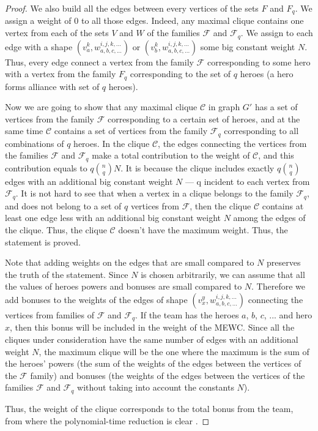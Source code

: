 \documentclass[smallextended]{svjour3}       %
\begin{document}
\begin{proof}
    We also build all the edges between every vertices of the sets $ F $ and $ F_q $. We assign a weight of 0 to all those edges. Indeed, any maximal clique contains one vertex from each of the sets $ V $ and $ W $ of the families $\mathcal {F}$ and $\mathcal {F}_q$. We assign to each edge with a shape $ (v_a^k, w_ {a, b, c, ...}^ {i, j, k, ...}) $ or $ (v_b^k, w_{a, b, c , ...}^{i, j, k, ...}) $ some big constant weight $ N $. Thus, every edge connect a vertex from the family $ \mathcal{F} $ corresponding to some hero with a vertex from the family $ F_q $ corresponding to the set of $ q $ heroes (a hero forms alliance with set of $q$ heroes). 
    
     Now we are going to show that any maximal clique $\mathcal{C}$ in graph $G'$ has a set of vertices from the family $\mathcal{F}$ corresponding to a certain set of heroes, and at the same time $\mathcal{C}$ contains a set of vertices from the family $ \mathcal{F}_q $ corresponding to all combinations of $q$ heroes. In the clique $\mathcal{C}$, the edges connecting the vertices from the families $ \mathcal{F} $ and $ \mathcal{F}_q $ make a total contribution to the weight of $\mathcal{C}$, and this contribution equals to $ q \binom{n}{q} N $. It is because the clique includes exactly $ q \binom{n}{q} $ edges with an additional big constant weight $N$ --- q incident to each vertex from $ \mathcal {F}_q $.  It is not hard to see that when a vertex in a clique belongs to the family $ \mathcal{F}_q $, and does not belong to a set of $q$ vertices from $ \mathcal {F} $, then the clique $\mathcal{C}$ contains at least one edge less with an additional big constant weight $ N $ among the edges of the clique. Thus, the clique $\mathcal{C}$ doesn't have the maximum weight. Thus, the statement is proved. 
    
    Note that adding weights on the edges that are small compared to $N$ preserves the truth of the statement. Since $N$ is chosen arbitrarily, we can assume that all the values of heroes powers and bonuses are small compared to $N$.
	Therefore we add bonuses to the weights of the edges of shape $ (v_x^{y}, w_{a, b, c, ...} ^ {i, j, k, ...}) $ connecting the vertices from families of $\mathcal{F} $ and $ \mathcal{F}_q $. If the team has the heroes $a$, $b$, $c$, ... and hero $x$, then this bonus will be included in the weight of the MEWC. Since all the cliques under consideration have the same number of edges with an additional weight $N$, the maximum clique will be the one where the maximum is the sum of the heroes' powers (the sum of the weights of the edges between the vertices of the $ \mathcal{F} $ family) and bonuses (the weights of the edges between the vertices of the families $ \mathcal{F} $ and $ \mathcal {F}_q $ without taking into account the constants $ N $).
    
Thus, the weight of the clique corresponds to the total bonus from the team, from where the polynomial-time reduction is clear    \blacksquare .
\end{proof}
\end{document}
